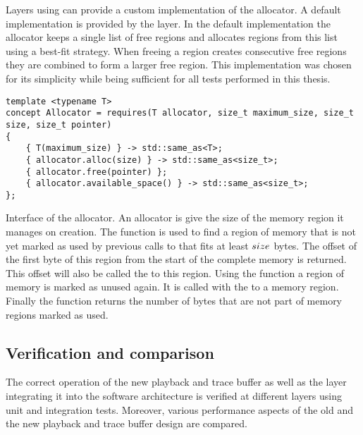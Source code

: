 Layers using \ayo{} can provide a custom implementation of the allocator. A default implementation is provided by the \ayo{} layer. In the default implementation the allocator keeps a single list of free regions and allocates regions from this list using a best-fit strategy. When freeing a region creates consecutive free regions they are combined to form a larger free region. This implementation was chosen for its simplicity while being sufficient for all tests performed in this thesis.
\begin{listing}
\begin{verbatim}
template <typename T>
concept Allocator = requires(T allocator, size_t maximum_size, size_t size, size_t pointer)
{
	{ T(maximum_size) } -> std::same_as<T>;
	{ allocator.alloc(size) } -> std::same_as<size_t>;
	{ allocator.free(pointer) };
	{ allocator.available_space() } -> std::same_as<size_t>;
};
\end{verbatim}
\caption{Interface of the allocator. An allocator is give the size of the memory region it manages on creation. The  function is used to find a region of memory that is not yet marked as used by previous calls to  that fits at least $\code{size}$ bytes. The offset of the first byte of this region from the start of the complete memory is returned. This offset will also be called the  to this region. Using the  function a region of memory is marked as unused again. It is called with the  to a memory region. Finally the  function returns the number of bytes that are not part of memory regions marked as used.}
\label{listing:allocator_interface}
\end{listing}

\subsection{Verification and comparison}
The correct operation of the new playback and trace buffer as well as the \ayo{} layer integrating it into the \BSSTwo{} software architecture is verified at different layers using unit and integration tests. Moreover, various performance aspects of the old and the new playback and trace buffer design are compared.

